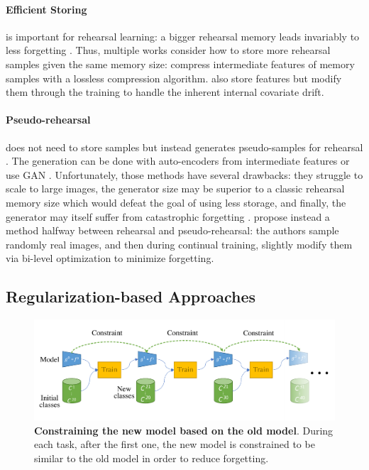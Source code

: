 \paragraph{Efficient Storing} is important for rehearsal learning: a bigger rehearsal memory leads
invariably to less forgetting \citep{hou2019ucir}. Thus, multiple works consider how to store more
rehearsal samples given the same memory size: \citet{hayes2020remind} compress intermediate features
of memory samples with a lossless compression algorithm.
\citet{iscen2020incrementalfeatureadaptation} also store features but modify them through the
training to handle the inherent internal covariate drift.

\paragraph{Pseudo-rehearsal} does not need to store samples but instead generates pseudo-samples for
rehearsal \citep{lesort2019generative}. The generation can be done with auto-encoders from
intermediate features \citep{kemker2018fearnet,ayub2021eec} or use \ac{GAN}
\citep{shin2017deep_generative_replay}. Unfortunately, those methods have several drawbacks: they
struggle to scale to large images, the generator size may be superior to a classic rehearsal memory
size which would defeat the goal of using less storage, and finally, the generator may itself suffer
from catastrophic forgetting \citep{zhai2019lifelonggan}. \citet{liu2020mnemonics} propose instead a
method halfway between rehearsal and pseudo-rehearsal: the authors sample randomly real images, and
then during continual training, slightly modify them via bi-level optimization
\citep{wang2018datasetdistillation} to minimize forgetting.


\subsection{Regularization-based Approaches}
\label{sec:related_regul}


\begin{figure}[tb]
      \begin{center}
            \includegraphics[width=1.0\linewidth]{images/related/constraints}
      \end{center}
      \caption{\textbf{Constraining the new model based on the old model}. During each task, after
            the first one, the new model is constrained to be similar to the old model in order to reduce
            forgetting.}
      \label{fig:related_protocol_constraints}
\end{figure}

